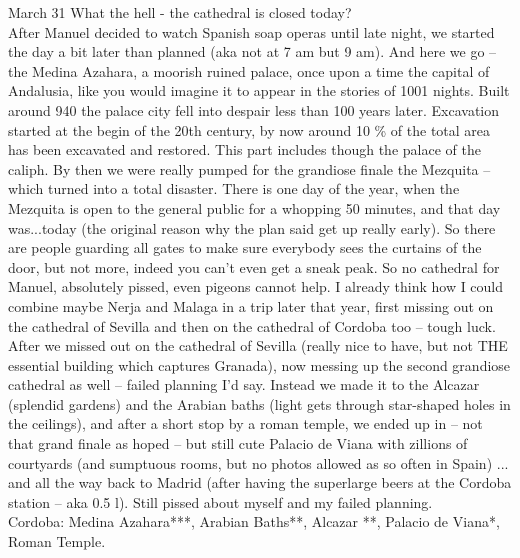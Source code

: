March 31 What the hell - the cathedral is closed today?\\
After Manuel decided to watch Spanish soap operas until late night, we started the day a bit later than planned (aka not at 7 am but 9 am). And here we go -- the Medina Azahara, a moorish ruined palace, once upon a time the capital of Andalusia, like you would imagine it to appear in the stories of 1001 nights. Built around 940 the palace city fell into despair less than 100 years later. Excavation started at the begin of the 20th century, by now around 10 \% of the total area has been excavated and restored. This part includes though the palace of the caliph. By then we were really pumped for the grandiose finale the Mezquita -- which turned into a total disaster. There is one day of the year, when the Mezquita is open to the general public for a whopping 50 minutes, and that day was...today (the original reason why the plan said get up really early).  So there are people guarding all gates to make sure everybody sees the curtains of the door, but not more, indeed you can't even get a sneak peak. So no cathedral for Manuel, absolutely pissed, even pigeons cannot help. I already think how I could combine maybe Nerja and Malaga in a trip later that year, first missing out on the cathedral of Sevilla and then on the cathedral of Cordoba too -- tough luck. After we missed out on the cathedral of Sevilla (really nice to have, but not THE essential building which captures Granada), now messing up the second grandiose cathedral as well -- failed planning I'd say. Instead we made it to the Alcazar (splendid gardens) and the Arabian baths (light gets through star-shaped holes in the ceilings), and after a short stop by a roman temple, we ended up in -- not that grand finale as hoped -- but still cute Palacio de Viana with zillions of courtyards (and sumptuous rooms, but no photos allowed as so often in Spain) ... and all the way back to Madrid (after having the superlarge beers at the Cordoba station -- aka 0.5 l). Still pissed about myself and my failed planning.\\

Cordoba:
Medina Azahara***,
Arabian Baths**,
Alcazar **,
Palacio de Viana*,
Roman Temple. \\


